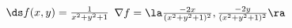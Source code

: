 {$\ds f(x,y) = \frac{1}{x^2+y^2+1}$
}
{$\nabla f = \la \frac{-2x}{(x^2+y^2+1)^2}, \frac{-2y}{(x^2+y^2+1)^2}\ra$
}